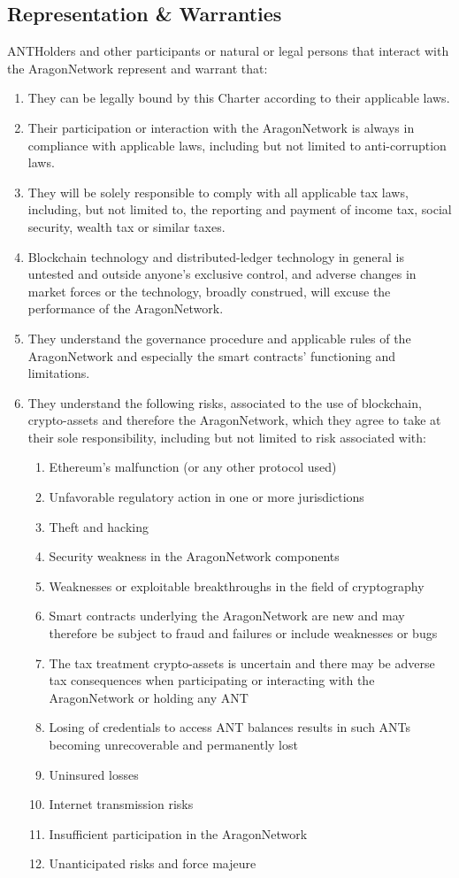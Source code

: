 \subsection{Representation \& Warranties}

\glspl{ANTHolder} and other participants or natural or legal persons that interact with the \gls{AragonNetwork} represent and warrant that:
\begin{enumerate}
	\item They can be legally bound by this Charter according to their applicable laws.
	\item  Their participation or interaction with the \gls{AragonNetwork} is always in compliance with applicable laws, including but not limited to anti-corruption laws.
	\item  They will be solely responsible to comply with all applicable tax laws, including, but not limited to, the reporting and payment of income tax, social security, wealth tax or similar taxes.
	\item  Blockchain technology and distributed-ledger technology in general is untested and outside anyone’s exclusive control, and adverse changes in market forces or the technology, broadly construed, will excuse the performance of the \gls{AragonNetwork}.
	\item They understand the governance procedure and applicable rules of the \gls{AragonNetwork} and especially the smart contracts' functioning and limitations.
	\item They understand the following risks, associated to the use of blockchain, crypto-assets and therefore the \gls{AragonNetwork}, which they agree to take at their sole responsibility, including but not limited to risk associated with:
	\begin{enumerate}
		\item Ethereum’s malfunction (or any other protocol used)
		\item Unfavorable regulatory action in one or more jurisdictions
		\item Theft and hacking
		\item Security weakness in the \gls{AragonNetwork} components
		\item Weaknesses or exploitable breakthroughs in the field of
		cryptography
		\item Smart contracts underlying the \gls{AragonNetwork} are new and may therefore be subject to fraud and failures or include weaknesses or bugs
		\item The tax treatment crypto-assets is uncertain and there may be adverse tax consequences when participating or interacting with the \gls{AragonNetwork} or holding any \ac{ANT}
		\item Losing of credentials to access \ac{ANT} balances results in such \acp{ANT} becoming unrecoverable and permanently lost
		\item Uninsured losses
		\item Internet transmission risks
		\item Insufficient participation in the \gls{AragonNetwork}
		\item Unanticipated risks and force majeure
	\end{enumerate}


\end{enumerate}
